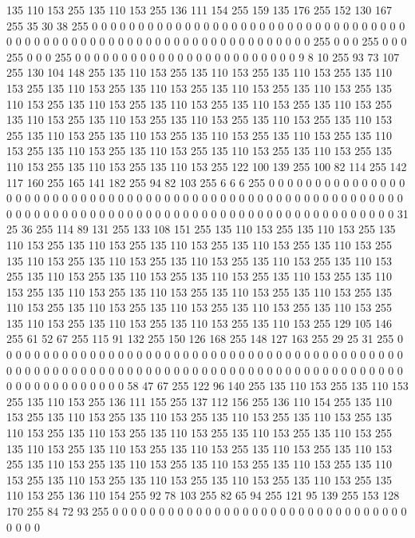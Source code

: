 135 110 153 255 135 110 153 255 136 111 154 255 159 135 176 255 152 130 167 255 35 30 38 255 0 0 0 0 0 0 0 0 0 0 0 0 0 0 0 0 0 0 0 0 0 0 0 0 0 0 0 0 0 0 0 0 0 0 0 0 0 0 0 0
0 0 0 0 0 0 0 0 0 0 0 0 0 0 0 0 0 0 0 0 0 0 0 0 0 0 0 255 0 0 0 255 0 0 0 255 0 0 0 255 0 0 0 0 0 0 0 0 0 0 0 0 0 0 0 0 0 0 0 0 0 0 0 0
9 8 10 255 93 73 107 255 130 104 148 255 135 110 153 255 135 110 153 255 135 110 153 255 135 110 153 255 135 110 153 255 135 110 153 255 135 110 153 255 135 110 153 255 135 110 153 255 135 110 153 255 135 110 153 255 135 110 153 255 135 110 153 255
135 110 153 255 135 110 153 255 135 110 153 255 135 110 153 255 135 110 153 255 135 110 153 255 135 110 153 255 135 110 153 255 135 110 153 255 135 110 153 255 135 110 153 255 135 110 153 255 135 110 153 255 135 110 153 255 135 110 153 255 135 110 153 255
135 110 153 255 122 100 139 255 100 82 114 255 142 117 160 255 165 141 182 255 94 82 103 255 6 6 6 255 0 0 0 0 0 0 0 0 0 0 0 0 0 0 0 0 0 0 0 0 0 0 0 0 0 0 0 0 0 0 0 0 0 0 0 0
0 0 0 0 0 0 0 0 0 0 0 0 0 0 0 0 0 0 0 0 0 0 0 0 0 0 0 0 0 0 0 0 0 0 0 0 0 0 0 0 0 0 0 0 0 0 0 0 0 0 0 0 0 0 0 0 0 0 0 0 0 0 0 0
31 25 36 255 114 89 131 255 133 108 151 255 135 110 153 255 135 110 153 255 135 110 153 255 135 110 153 255 135 110 153 255 135 110 153 255 135 110 153 255 135 110 153 255 135 110 153 255 135 110 153 255 135 110 153 255 135 110 153 255 135 110 153 255
135 110 153 255 135 110 153 255 135 110 153 255 135 110 153 255 135 110 153 255 135 110 153 255 135 110 153 255 135 110 153 255 135 110 153 255 135 110 153 255 135 110 153 255 135 110 153 255 135 110 153 255 135 110 153 255 135 110 153 255 135 110 153 255
135 110 153 255 129 105 146 255 61 52 67 255 115 91 132 255 150 126 168 255 148 127 163 255 29 25 31 255 0 0 0 0 0 0 0 0 0 0 0 0 0 0 0 0 0 0 0 0 0 0 0 0 0 0 0 0 0 0 0 0 0 0 0 0
0 0 0 0 0 0 0 0 0 0 0 0 0 0 0 0 0 0 0 0 0 0 0 0 0 0 0 0 0 0 0 0 0 0 0 0 0 0 0 0 0 0 0 0 0 0 0 0 0 0 0 0 0 0 0 0 0 0 0 0 0 0 0 0
58 47 67 255 122 96 140 255 135 110 153 255 135 110 153 255 135 110 153 255 136 111 155 255 137 112 156 255 136 110 154 255 135 110 153 255 135 110 153 255 135 110 153 255 135 110 153 255 135 110 153 255 135 110 153 255 135 110 153 255 135 110 153 255
135 110 153 255 135 110 153 255 135 110 153 255 135 110 153 255 135 110 153 255 135 110 153 255 135 110 153 255 135 110 153 255 135 110 153 255 135 110 153 255 135 110 153 255 135 110 153 255 135 110 153 255 135 110 153 255 135 110 153 255 135 110 153 255
135 110 153 255 136 110 154 255 92 78 103 255 82 65 94 255 121 95 139 255 153 128 170 255 84 72 93 255 0 0 0 0 0 0 0 0 0 0 0 0 0 0 0 0 0 0 0 0 0 0 0 0 0 0 0 0 0 0 0 0 0 0 0 0
